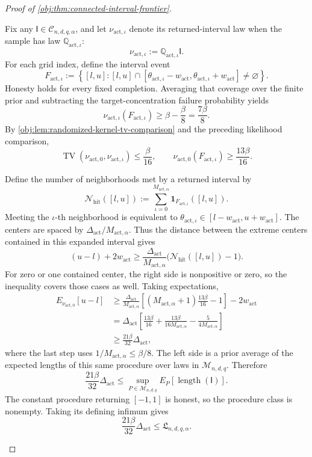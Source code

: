 \begin{proof}[Proof of \cref{obj:thm:connected-interval-frontier}]
\begin{enumerate}
Fix any \(\mathsf I\in\mathcal C_{n,d,q,\alpha}\), and let
\(\nu_{\mathrm{act},\iota}\) denote its returned-interval law when the
sample has law \(\mathbb Q_{\mathrm{act},\iota}\):
\[
\nu_{\mathrm{act},\iota}
:=\mathbb Q_{\mathrm{act},\iota}\mathsf I.
\]
For each grid index, define the interval event
\[
F_{\mathrm{act},\iota}
:=
\left\{
[l,u]:
[l,u]\cap
[\theta_{\mathrm{act},\iota}-w_{\mathrm{act}},
 \theta_{\mathrm{act},\iota}+w_{\mathrm{act}}]
\ne\varnothing
\right\}.
\]
Honesty holds for every fixed completion. Averaging that coverage over
the finite prior and subtracting the target-concentration failure
probability yields
\[
\nu_{\mathrm{act},\iota}(F_{\mathrm{act},\iota})
\ge\beta-\frac\beta8=\frac{7\beta}{8}.
\]
By \cref{obj:lem:randomized-kernel-tv-comparison} and the preceding
likelihood comparison,
\[
\operatorname{TV}
(\nu_{\mathrm{act},0},\nu_{\mathrm{act},\iota})
\le\frac\beta{16},
\qquad
\nu_{\mathrm{act},0}(F_{\mathrm{act},\iota})
\ge\frac{13\beta}{16}.
\]

Define the number of neighborhoods met by a returned interval by
\[
\mathcal N_{\mathrm{hit}}([l,u])
:=
\sum_{\iota=0}^{M_{\mathrm{act},\alpha}}
\mathbf1_{F_{\mathrm{act},\iota}}([l,u]).
\]
Meeting the \(\iota\)-th neighborhood is equivalent to
\(\theta_{\mathrm{act},\iota}\in[l-w_{\mathrm{act}},u+w_{\mathrm{act}}]\).
The centers are spaced by
\(\Delta_{\mathrm{act}}/M_{\mathrm{act},\alpha}\). Thus the distance
between the extreme centers contained in this expanded interval gives
\[
(u-l)+2w_{\mathrm{act}}
\ge
\frac{\Delta_{\mathrm{act}}}{M_{\mathrm{act},\alpha}}
\bigl(\mathcal N_{\mathrm{hit}}([l,u])-1\bigr).
\]
For zero or one contained center, the right side is nonpositive or
zero, so the inequality covers those cases as well. Taking expectations,
\[
\begin{aligned}
E_{\nu_{\mathrm{act},0}}[u-l]
&\ge
\frac{\Delta_{\mathrm{act}}}{M_{\mathrm{act},\alpha}}
\left[
(M_{\mathrm{act},\alpha}+1)\frac{13\beta}{16}-1
\right]
-2w_{\mathrm{act}}\\
&=
\Delta_{\mathrm{act}}
\left[
\frac{13\beta}{16}
+\frac{13\beta}{16M_{\mathrm{act},\alpha}}
-\frac{5}{4M_{\mathrm{act},\alpha}}
\right]\\
&\ge\frac{21\beta}{32}\Delta_{\mathrm{act}},
\end{aligned}
\]
where the last step uses \(1/M_{\mathrm{act},\alpha}\le\beta/8\).
The left side is a prior average of the expected lengths of this same
procedure over laws in \(\mathcal M_{n,d,q}\). Therefore
\[
\frac{21\beta}{32}\Delta_{\mathrm{act}}
\le
\sup_{P\in\mathcal M_{n,d,q}}E_P[\operatorname{length}(\mathsf I)].
\]
The constant procedure returning \([-1,1]\) is honest, so the procedure
class is nonempty. Taking its defining infimum gives
\[
\frac{21\beta}{32}\Delta_{\mathrm{act}}
\le\mathfrak L_{n,d,q,\alpha}.
\]


\end{enumerate}
\end{proof}
